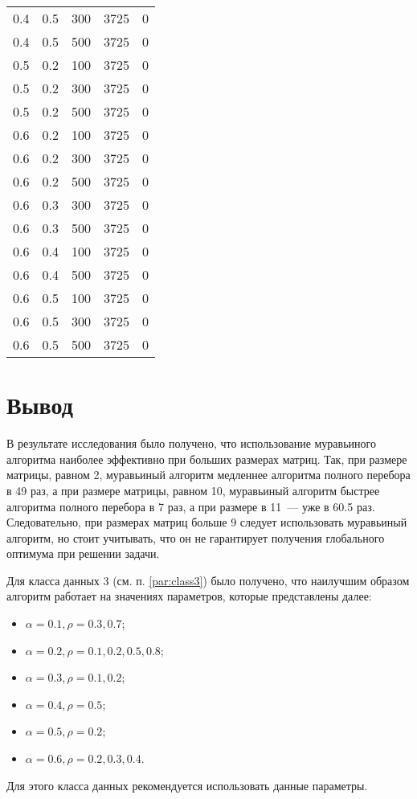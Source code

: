 \begin{center}
\begin{longtable}[c]{|r|r|r|r|r|}
		0.4 &  0.5 &  300 & 3725 &     0 \\
		0.4 &  0.5 &  500 & 3725 &     0 \\ \hline
		0.5 &  0.2 &  100 & 3725 &     0 \\
		0.5 &  0.2 &  300 & 3725 &     0 \\
		0.5 &  0.2 &  500 & 3725 &     0 \\ \hline
		0.6 &  0.2 &  100 & 3725 &     0 \\
		0.6 &  0.2 &  300 & 3725 &     0 \\
		0.6 &  0.2 &  500 & 3725 &     0 \\ \hline
		0.6 &  0.3 &  300 & 3725 &     0 \\
		0.6 &  0.3 &  500 & 3725 &     0 \\ \hline
		0.6 &  0.4 &  100 & 3725 &     0 \\
		0.6 &  0.4 &  500 & 3725 &     0 \\ \hline
		0.6 &  0.5 &  100 & 3725 &     0 \\
		0.6 &  0.5 &  300 & 3725 &     0 \\
		0.6 &  0.5 &  500 & 3725 &     0 \\ \hline
	\end{longtable}
\end{center}

\section{Вывод}

В результате исследования было получено, что использование муравьиного алгоритма наиболее эффективно при больших размерах матриц.
Так, при размере матрицы, равном 2, муравьиный алгоритм медленнее алгоритма полного перебора в 49 раз, а при размере матрицы, равном 10, муравьиный алгоритм быстрее алгоритма полного перебора в 7 раз, а при размере в 11~--- уже в 60.5 раз.
Следовательно, при размерах матриц больше 9 следует использовать муравьиный алгоритм, но стоит учитывать, что он не гарантирует получения глобального оптимума при решении задачи.

Для класса данных 3 (см. п. \ref{par:class3}) было получено, что наилучшим образом алгоритм работает на значениях параметров, которые представлены далее:
\begin{itemize}[label=---]
	\item $\alpha = 0.1, \rho = 0.3, 0.7$;
	\item $\alpha = 0.2, \rho = 0.1, 0.2, 0.5, 0.8$;
	\item $\alpha = 0.3, \rho = 0.1, 0.2$;
	\item $\alpha = 0.4, \rho = 0.5$;
	\item $\alpha = 0.5, \rho = 0.2$;
	\item $\alpha = 0.6, \rho = 0.2, 0.3, 0.4$.
\end{itemize} 
Для этого класса данных рекомендуется использовать данные параметры.


